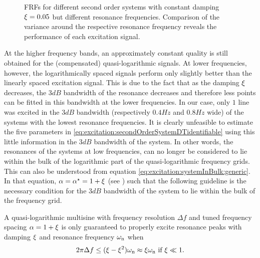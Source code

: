   \begin{figure}%
    \centering
      \setlength{}
      \setlength\figureheight{0.68\figurewidth}
    
    \caption[Simulated  of systems with damping $0.05$ for different excitation signals.]{\Glspl{FRF} for different second order systems with constant damping $\xi_{}=0.05$ but different resonance frequencies. 
    Comparison of the variance around the respective resonance frequency reveals the performance of each excitation signal.}%
    \label{fig:excitation:damping005}
  \end{figure}

  At the higher frequency bands, an approximately constant quality is still obtained for the (compensated) quasi-logarithmic signals.
  At lower frequencies, however, the logarithmically spaced signals perform only slightly better than the linearly spaced excitation signal.
  This is due to the fact that as the damping $\xi_{}$ decreases, the $3\unit{dB}$ bandwidth of the resonance decreases and therefore less points can be fitted in this bandwidth at the lower frequencies.
  In our case, only $1$ line was excited in the $3 \unit{dB}$ bandwidth (respectively $0.4 \unit{Hz}$ and $0.8\unit{Hz}$ wide) of the systems with the lowest resonance frequencies.
  It is clearly unfeasible to estimate the five parameters in
  \eqref{eq:excitation:secondOrderSystemDTidentifiable} using this little information in the $3\unit{dB}$ bandwidth of the system.
  In other words, the resonances of the systems at low frequencies, can no longer be considered to lie within the bulk of the logarithmic part of the quasi-logarithmic frequency grids.
  This can also be understood from equation \eqref{eq:excitation:systemInBulk:generic}.
  In that equation, $\alpha = \alpha^{\star} = 1 + \xi_{}$ (see ) such that the following guideline is the necessary condition for the $3\unit{dB}$ bandwidth of the system to lie within the bulk of the frequency grid.

\begin{guideline}
\label{guide:excitation:systemInBulk:tuned}
 A quasi-logarithmic multisine with frequency resolution $\Delta f$ and tuned frequency spacing $\alpha=1+\xi_{}$ is only guaranteed to properly excite resonance peaks with damping $\xi_{}$ and resonance frequency $\omega_{\mathrm{n}}$ when 
  \begin{equation}
    2 \pi \Delta f \leq (\xi_{} - \xi_{}^2) \omega_{\mathrm{n}} 
    \approx \xi_{} \omega_{\mathrm{n}} \text{ if $\xi_{} \ll 1$}
    \text{.}
    \label{eq:excitation:systemInBulk:tuned}
  \end{equation}
  \end{guideline}

